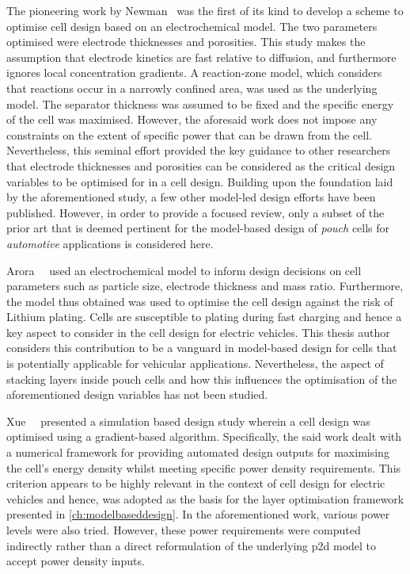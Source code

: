 The pioneering  work by Newman~\cite{Newman1995}  was the  first of its  kind to
develop a scheme to optimise cell  design based on an electrochemical model. The
two parameters optimised  were electrode thicknesses and  porosities. This study
makes the assumption that electrode kinetics are fast relative to diffusion, and
furthermore ignores local concentration  gradients. A reaction-zone model, which
considers that  reactions occur  in a  narrowly confined area,  was used  as the
underlying  model. The  separator  thickness was  assumed to  be  fixed and  the
specific energy of the cell was  maximised. However, the aforesaid work does not
impose any constraints  on the extent of  specific power that can  be drawn from
the cell. Nevertheless,  this seminal effort provided the key  guidance to other
researchers that electrode  thicknesses and porosities can be  considered as the
critical design  variables to be optimised  for in a cell  design. Building upon
the foundation  laid by the aforementioned  study, a few other  model-led design
efforts have  been published. However,  in order  to provide a  focused review,
only a  subset of  the prior art  that is deemed  pertinent for  the model-based
design of  \emph{pouch} cells  for \emph{automotive} applications  is considered
here.

Arora~\etal~\cite{Arora1999}  used an  electrochemical  model  to inform  design
decisions on cell parameters such as particle size, electrode thickness and mass
ratio. Furthermore, the model thus obtained was used to optimise the cell design
against the  risk of Lithium  plating. Cells  are susceptible to  plating during
fast charging and hence a key aspect to consider in the cell design for electric
vehicles. This  thesis author considers  this contribution  to be a  vanguard in
model-based  design  for cells  that  is  potentially applicable  for  vehicular
applications. Nevertheless, the aspect of stacking layers inside pouch cells and
how this influences the optimisation  of the aforementioned design variables has
not been studied.

Xue~\etal~\cite{Xue2013}  presented a  simulation based  design study  wherein a
cell design  was optimised using  a gradient-based algorithm.  Specifically, the
said  work dealt  with  a  numerical framework  for  providing automated  design
outputs for maximising  the cell's energy density whilst  meeting specific power
density  requirements. This  criterion  appears  to be  highly  relevant in  the
context of cell design for electric vehicles and hence, was adopted as the basis
for the layer optimisation framework presented in \cref{ch:modelbaseddesign}. In
the aforementioned  work, various power  levels were also tried.  However, these
power requirements were  computed indirectly rather than  a direct reformulation
of the underlying \gls{p2d} model to accept power density inputs.

